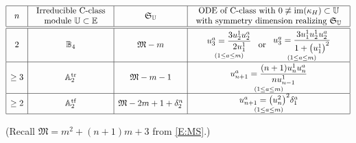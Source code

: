 \documentclass[pdftex]{sigma}%
\DeclareMathOperator{\img}{im}
\DeclareMathOperator{\tf}{tf}
\DeclareMathOperator{\tr}{tr}
\newcommand\fM{\mathfrak{M}}
\newcommand\fS{\mathfrak{S}}
\newcommand{\R}{\mathbb{R}}
\newcommand\bbE{\mathbb{E}}
\newcommand\bbU{\mathbb{U}}
\newcommand\bbA{\mathbb{A}}
\newcommand\bbB{\mathbb{B}}
\numberwithin{equation}{section}
\begin{document}
\begin{table}[h]\renewcommand{\arraystretch}{1.5}
\centering	
$\begin{array}{|c|c|c|c|} \hline
n& \begin{array}{c}
\text{Irreducible C-class}\\ \text{module } \bbU\subset \bbE
\end{array} &\fS_{\bbU} & \begin{array}{c}
\text{ODE of C-class with } 0\not\equiv \img(\kappa_H) \subset \bbU\\ \text{with symmetry dimension realizing } \fS_\bbU
\end{array} \\ \hline\hline
2 & \bbB_4 & \fM -m &\begin{array}{c}
\underset{(1 \le a \le m)}{u_3^a= \displaystyle\frac{3u_2^1 u_2^a}{2u^1_{1}}}
\end{array} \  \text{or}\  \begin{array}{c}
\underset{(1 \le a \le m)}{u_3^a= \displaystyle\frac{3u_1^1u_2^{1^{\vphantom{1}}} u_2^a}{1 + \bigl(u^1_1\bigr)^2}}\\
\end{array}\\\hline
\ge 3 & \bbA_2^{\tr}& \fM -m-1 & \begin{array}{c}
\underset{(1 \le a \le m)}{u_{n+1}^a= \displaystyle\frac{(n+1)u_n^{1^{\vphantom{1}}} u_n^a}{nu^1_{n-1}}}	\\
\end{array}\\	\hline		
\ge 2& \bbA_2^{\tf} & \fM -2m +1 +\delta_2^n &
\begin{array}{c}
\underset{(1 \le a \le m)}{u_{n+1}^a= \bigl(u_n^2\bigr)^2\delta_1^a}	\\
\end{array} \\ \hline
\end{array}$

\vspace{1mm}

(Recall $\fM = m^2+(n+1)m+3$ from \eqref{E:MS}.)

\caption{Classification over $\R$ of submaximally symmetric vector ODEs \eqref{ODE} of C-class of order $n+1 \geq 3$.}
\label{Tab:CM}
\end{table}
\end{document}
